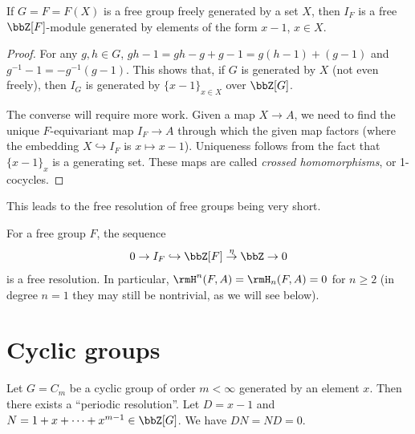 \begin{thm}
    If $G=F=F(X)$ is a free group freely generated by a set $X$, then $I_F$ is a free $\bbZ[F]$-module generated by elements of the form $x-1$, $x\in X$.
\end{thm}
\begin{proof}
    For any $g,h\in G$, $gh-1=gh-g+g-1=g(h-1)+(g-1)$ and $g^{-1}-1=-g^{-1}(g-1)$. This shows that, if $G$ is generated by $X$ (not even freely), then $I_G$ is generated by $\{x-1\}_{x\in X}$ over $\bbZ[G]$.

    The converse will require more work. Given a map $X\to A$, we need to find the unique $F$-equivariant map $I_F\to A$ through which the given map factors (where the embedding $X\hookrightarrow I_F$ is $x\mapsto x-1$). Uniqueness follows from the fact that $\{x-1\}_x$ is a generating set. These maps are called \emph{crossed homomorphisms}, or 1-cocycles.
\end{proof}

This leads to the free resolution of free groups being very short.
\begin{cor}
    For a free group $F$, the sequence
    \[0\to I_F\hookrightarrow \bbZ[F]\overset{\eta}{\to} \bbZ\to 0\]
    is a free resolution. In particular, $\rmH^n(F,A)=\rmH_n(F,A)=0$ for $n\geq 2$ (in degree $n=1$ they may still be nontrivial, as we will see below).
\end{cor}





\section{Cyclic groups}


Let $G=C_m$ be a cyclic group of order $m<\infty$ generated by an element $x$. Then there exists a ``periodic resolution''. Let $D=x-1$ and $N=1+x+\cdots +x^{m-1}\in\bbZ[G]$. We have $DN=ND=0$.

